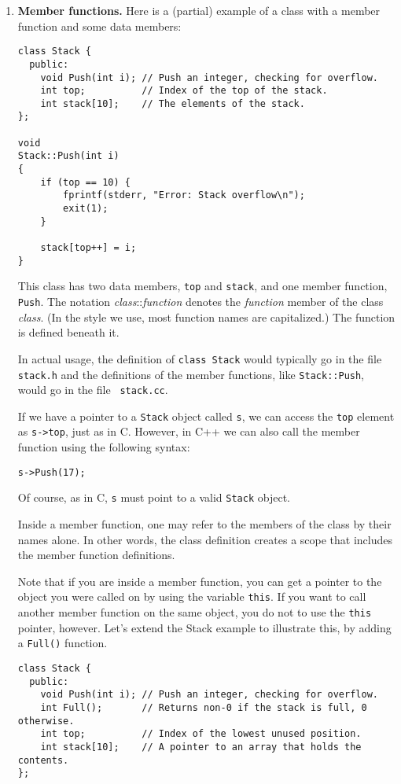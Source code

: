 \begin{enumerate}
\item {\bf Member functions.}   Here is a (partial) example of a class
with a member function and some data members:
\begin{verbatim}
class Stack {
  public:
    void Push(int i); // Push an integer, checking for overflow.
    int top;          // Index of the top of the stack.
    int stack[10];    // The elements of the stack.
};

void
Stack::Push(int i)
{
    if (top == 10) {
        fprintf(stderr, "Error: Stack overflow\n");
        exit(1);
    }
    
    stack[top++] = i;
}
\end{verbatim}
This class has two data members, {\tt top} and {\tt stack}, and one
member function,
{\tt Push}.  The notation {\em class}::{\em function} denotes the
{\em function} member of the class {\em class}.  (In the style we use,
most function names are capitalized.)  The function is defined beneath
it.

In actual usage, the definition of {\tt class Stack} would typically
go in the file {\tt stack.h} and the definitions of the member
functions, like {\tt Stack::Push}, would go in the file {\tt
stack.cc}.

If we have a pointer to a {\tt Stack} object called {\tt s}, we can
access the {\tt top} element as {\tt s->top}, just as in C.  However,
in C++ we can also call the member function using the following syntax:
\begin{verbatim}
s->Push(17);
\end{verbatim}
Of course, as in C, {\tt s} must point to a valid {\tt Stack} object.

Inside a member function, one may refer to the members of the class
by their names alone.  In other words, the class definition
creates a scope that includes the member function definitions.

Note that if you are inside a member function, you can get a pointer
to the object you were called on by using the variable {\tt this}.
If you want to call another member function on the same object, you
do not to use the {\tt this} pointer, however.  Let's extend the Stack
example to illustrate this, by adding a {\tt Full()} function.
\begin{verbatim}
class Stack {
  public:
    void Push(int i); // Push an integer, checking for overflow.
    int Full();       // Returns non-0 if the stack is full, 0 otherwise.
    int top;          // Index of the lowest unused position.
    int stack[10];    // A pointer to an array that holds the contents.
};


\end{verbatim}
\end{enumerate}
